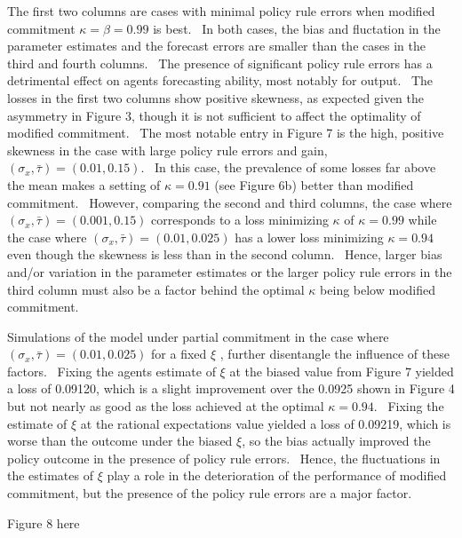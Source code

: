 \documentclass{article}
\begin{document}
\begin{doublespace}
The first two columns are cases with minimal policy rule errors when
modified commitment $\kappa =\beta =0.99$ is best. \ In both cases, the bias
and fluctation in the parameter estimates and the forecast errors are
smaller than the cases in the third and fourth columns. \ The presence of
significant policy rule errors has a detrimental effect on agents
forecasting ability, most notably for output. \ The losses in the first two
columns show positive skewness, as expected given the asymmetry in Figure 3,
though it is not sufficient to affect the optimality of modified commitment.
\ The most notable entry in Figure 7 is the high, positive skewness in the
case with large policy rule errors and gain, $\left( \sigma _{x},\bar{\tau}%
\right) =\left( 0.01,0.15\right) $. \ In this case, the prevalence of some
losses far above the mean makes a setting of $\kappa =0.91$ (see Figure 6b)
better than modified commitment. \ However, comparing the second and third
columns, the case where $\left( \sigma _{x},\bar{\tau}\right) =\left(
0.001,0.15\right) $ corresponds to a loss minimizing $\kappa $ of $\kappa 
=0.99$ while the case where $\left( \sigma _{x},\bar{\tau}\right) =\left(
0.01,0.025\right) $ has a lower loss minimizing $\kappa =0.94$ even though
the skewness is less than in the second column. \ Hence, larger bias and/or
variation in the parameter estimates or the larger policy rule errors in the
third column must also be a factor behind the optimal $\kappa $ being below
modified commitment.

Simulations of the model under partial commitment in the case where $\left(
\sigma _{x},\bar{\tau}\right) =\left( 0.01,0.025\right) $ for a fixed $\xi 
$%
, further disentangle the influence of these factors. \ Fixing the agents
estimate of $\xi $ at the biased value from Figure 7 yielded a loss of
0.09120, which is a slight improvement over the 0.0925 shown in Figure 4 but
not nearly as good as the loss achieved at the optimal $\kappa =0.94$. \
Fixing the estimate of $\xi $ at the rational expectations value yielded a
loss of 0.09219, which is worse than the outcome under the biased $\xi $, so
the bias actually improved the policy outcome in the presence of policy rule
errors. \ Hence, the fluctuations in the estimates of $\xi $ play a role in
the deterioration of the performance of modified commitment, but the
presence of the policy rule errors are a major factor. \ 

\begin{center}
Figure 8 here
\end{center}


\end{doublespace}
\end{document}
